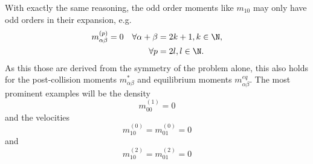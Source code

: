 With exactly the same reasoning, the odd order moments like $m_{10}$ may only have odd orders in their expansion, e.g.
\begin{equation}
  \label{eq: kill odd moments even order}
  \begin{aligned}
    m_{\alpha\beta}^{(p)} = 0 \quad
    \forall\alpha+\beta & = 2k+1, k\in\N, \\
    \forall p & = 2l, l\in\N.
  \end{aligned}
\end{equation}
As this those are derived from the symmetry of the problem alone, this also holds for the post-collision moments $m_{\alpha\beta}^*$ and equilibrium moments $m_{\alpha\beta}^{eq}$.
The most prominent examples will be the density
\begin{equation}
  m_{00}^{(1)}=0
\end{equation}
and the velocities
\begin{equation}
  m_{10}^{(0)} = m_{01}^{(0)} = 0
\end{equation}
and
\begin{equation}
  m_{10}^{(2)} = m_{01}^{(2)} = 0
\end{equation}

